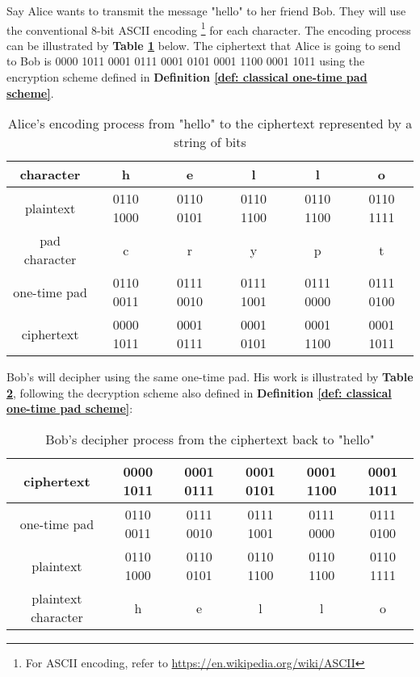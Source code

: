 \begin{example}
\label{example one-time pad}
Say Alice wants to transmit the message "hello" to her friend Bob.  They will use the conventional 8-bit ASCII encoding \footnote{For ASCII encoding, refer to \url{https://en.wikipedia.org/wiki/ASCII}} for each character.  The encoding process can be illustrated by \textbf{Table  \ref{table: one-time pad encoding}} below. The ciphertext that Alice is going to send to Bob is 0000 1011 0001 0111 0001 0101 0001 1100 0001 1011 using the encryption scheme defined in \textbf{Definition \ref{def: classical one-time pad scheme}}.

\begin{table}[h]
\centering 
\begin{tabular}{|c|c|c|c|c|c|}
\hline
character & h & e & l & l & o \\ \hline
plaintext & 0110 1000 & 0110 0101 & 0110 1100 & 0110 1100 & 0110 1111 \\ \hline
pad character & c & r & y & p & t \\ \hline
one-time pad & 0110 0011 & 0111 0010 & 0111 1001 & 0111 0000 & 0111 0100 \\ \hline
ciphertext & 0000 1011 & 0001 0111 & 0001 0101 & 0001 1100 & 0001 1011 \\ \hline
\end{tabular}
\caption{Alice's encoding process from "hello" to the ciphertext represented by a string of bits}
\label{table: one-time pad encoding}
\end{table}

Bob's will decipher using the same one-time pad. His work is illustrated by \textbf{Table \ref{table: one-time pad decoding}}, following the decryption scheme also defined in \textbf{Definition \ref{def: classical one-time pad scheme}}:
\begin{table}[h] 
\centering
\begin{tabular}{|c|c|c|c|c|c|}
\hline
ciphertext & 0000 1011 & 0001 0111 & 0001 0101 & 0001 1100 & 0001 1011 \\ \hline
one-time pad & 0110 0011 & 0111 0010 & 0111 1001 & 0111 0000 & 0111 0100 \\ \hline
plaintext & 0110 1000 & 0110 0101 & 0110 1100 & 0110 1100 & 0110 1111 \\ \hline
plaintext character & h & e & l & l & o \\ \hline
\end{tabular}
\caption{Bob's decipher process from the ciphertext back to "hello"}
\label{table: one-time pad decoding}
\end{table}
\end{example}




